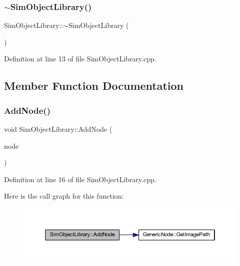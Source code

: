 \mbox{\label{class_sim_object_library_acb3952bfbbb6ad77f8ce34883aa4a23d}} 
\subsubsection{\texorpdfstring{$\sim$\+Sim\+Object\+Library()}{~SimObjectLibrary()}}
{\footnotesize\ttfamily Sim\+Object\+Library\+::$\sim$\+Sim\+Object\+Library (\begin{DoxyParamCaption}{ }\end{DoxyParamCaption})}



Definition at line 13 of file Sim\+Object\+Library.\+cpp.



\subsection{Member Function Documentation}
\mbox{\label{class_sim_object_library_a52aa03db97b37434b94bbecf73c74e1c}} 
\subsubsection{\texorpdfstring{Add\+Node()}{AddNode()}}
{\footnotesize\ttfamily void Sim\+Object\+Library\+::\+Add\+Node (\begin{DoxyParamCaption}\item[{\hyperlink{class_generic_node}{Generic\+Node} $\ast$}]{node }\end{DoxyParamCaption})}



Definition at line 16 of file Sim\+Object\+Library.\+cpp.

Here is the call graph for this function\+:
\nopagebreak
\begin{figure}[H]
\begin{center}
\leavevmode
\includegraphics[width=350pt]{class_sim_object_library_a52aa03db97b37434b94bbecf73c74e1c_cgraph}
\end{center}
\end{figure}
\mbox{\label{class_sim_object_library_af66daff6ed6fcecb0509e47a97847986}} 
